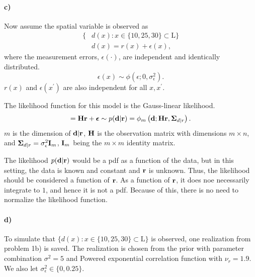 \paragraph{c)}
Now assume the spatial variable is observed as 
\begin{align*}
    \{&d(x): x \in \{10,25,30\} \subset \text{L} \}\\
    &d(x) = r(x) + \epsilon(x),
\end{align*}
where the measurement errors, $\epsilon(\cdot)$, are independent and identically distributed.
\begin{equation*}
    \epsilon(x) \sim \phi(\epsilon; 0,\sigma^2_{\epsilon}).
\end{equation*}
$r(x)$ and $\epsilon(x^\prime)$ are also independent for all $x,x^\prime$.

The likelihood function for this model is the Gauss-linear likelihood.
\begin{equation}
    [\vect{d}|\vect{r}] = \matr{H}\vect{r} + \vect{\epsilon} \sim p(\vect{d}|\vect{r}) = 
    \phi_m\left(\vect{d};\matr{H}\vect{r}, \matr{\Sigma}_{d|r}\right).
\end{equation}
$m$ is the dimension of $\boldsymbol{\mathbf{d}}|\boldsymbol{\mathbf{r}}$, $\boldsymbol{\mathbf{H}}$ is the observation matrix with dimensions $m \times n$, and $\boldsymbol{\mathbf{\Sigma}}_{d|r} = \sigma^2_{\epsilon} \boldsymbol{\mathbf{I}}_m$, $\boldsymbol{\mathbf{I}}_m$ being the $m \times m$ identity matrix.

The likelihood $p(\boldsymbol{\mathbf{d}}|\boldsymbol{\mathbf{r}})$ would be a pdf as a function of the data, but in this setting, the data is known and constant and $\boldsymbol{\mathbf{r}}$ is unknown. Thus, the likelihood should be considered a function of $\boldsymbol{\mathbf{r}}$. As a function of $\boldsymbol{\mathbf{r}}$, it does noe necessarily integrate to $1$, and hence it is not a pdf. Because of this, there is no need to normalize the likelihood function.


\paragraph{d)}
To simulate that $\{d(x): x \in \{10,25,30\} \subset \text{L} \}$  is observed, one realization from problem 1b) is saved. The realization is chosen from the prior with parameter combination $\sigma^2 = 5$ and Powered exponential correlation function with $\nu_r = 1.9$. We also let $\sigma^2_{\epsilon} \in \{0,0.25\}$.

